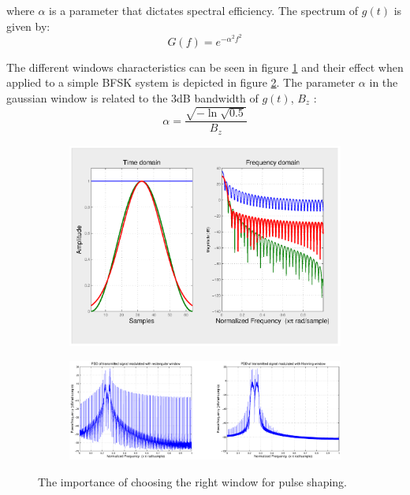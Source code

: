 \documentclass[12pt,a4paper,openright]{article}
\begin{document}
where $\alpha$ is a parameter that dictates spectral efficiency. The spectrum of $g(t)$ is given by: 
\[G(f) = {e^{ - {\alpha ^2}{f^2}}}\]


The different windows characteristics can be seen in figure \ref{fig:wc} and their effect when applied to a simple BFSK system is depicted in figure \ref{fig:wcomp}. The parameter $\alpha$ in the gaussian window is related to the 3dB bandwidth of $g(t)$, $B_z$ \cite{GoertzelPaper}:
\[\alpha  = \frac{{\sqrt { - \ln \sqrt {0.5} } }}{{{B_z}}}\]

 \begin{figure}[h]
 \centering
  \label{fig:wincar}
\begin{subfigure}[h]{1\textwidth}
 \centering
    \includegraphics[scale=0.45, trim=0 0 30cm 0, clip=true]{wincomp.eps}
    \label{fig:wc}
\end{subfigure}

\qquad
\qquad

\begin{subfigure}[h]{1\textwidth}
 \centering
    \includegraphics[scale=0.38]{txwinrectVShann.eps}
    \label{fig:wcomp}
    
    \end{subfigure}
    
    \caption{The importance of choosing the right window for pulse shaping.}
    \label{fig:main}
\end{figure}
\end{document}
